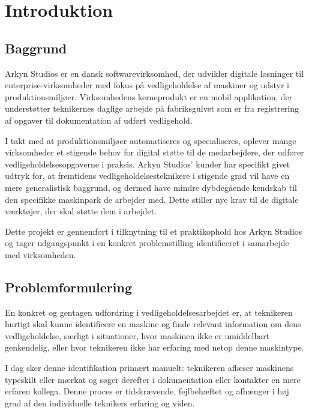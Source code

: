 \chapter{Introduktion}
\label{chap:introduction}

\section{Baggrund}
\label{sec:baggrund}

Arkyn Studios er en dansk softwarevirksomhed, der udvikler digitale løsninger til enterprise-virksomheder med fokus på vedligeholdelse af maskiner og udstyr i produktionsmiljøer. Virksomhedens kerneprodukt er en mobil applikation, der understøtter teknikernes daglige arbejde på fabriksgulvet som er fra registrering af opgaver til dokumentation af udført vedligehold.

I takt med at produktionsmiljøer automatiseres og specialiseres, oplever mange virksomheder et stigende behov for digital støtte til de medarbejdere, der udfører vedligeholdelsesopgaverne i praksis. Arkyn Studios' kunder har specifikt givet udtryk for, at fremtidens vedligeholdelsesteknikere i stigende grad vil have en mere generalistisk baggrund, og dermed have mindre dybdegående kendskab til den specifikke maskinpark de arbejder med. Dette stiller nye krav til de digitale værktøjer, der skal støtte dem i arbejdet.

Dette projekt er gennemført i tilknytning til et praktikophold hos Arkyn Studios og tager udgangspunkt i en konkret problemstilling identificeret i samarbejde med virksomheden.

\section{Problemformulering}
\label{sec:problemformulering}

En konkret og gentagen udfordring i vedligeholdelsesarbejdet er, at teknikeren hurtigt skal kunne identificere en maskine og finde relevant information om dens vedligeholdelse, særligt i situationer, hvor maskinen ikke er umiddelbart genkendelig, eller hvor teknikeren ikke har erfaring med netop denne maskintype.

I dag sker denne identifikation primært manuelt: teknikeren aflæser maskinens typeskilt eller mærkat og søger derefter i dokumentation eller kontakter en mere erfaren kollega. Denne proces er tidskrævende, fejlbehæftet og afhænger i høj grad af den individuelle teknikers erfaring og viden.


